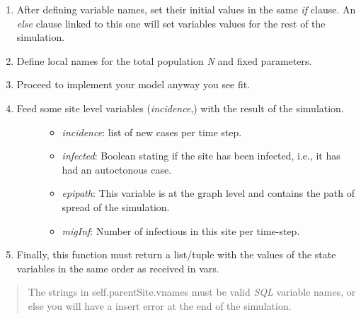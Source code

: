 \documentclass[a4paper,10pt]{manual}
\begin{document}
\begin{enumerate}
\begin{description}
\begin{enumerate}
\item {} 
After defining variable names, set their initial values in the same \emph{if} clause. An \emph{else} clause linked to this one will set variables values for the rest of the simulation.

\item {} 
Define local names for the total population \emph{N} and fixed parameters.

\item {} 
Proceed to implement your model anyway you see fit.

\item {} \begin{description}
\item[Feed some site level variables (\emph{incidence},) with the result of the simulation.]\begin{itemize}
\item {} 
\emph{incidence}: list of new cases per time step.

\item {} 
\emph{infected}: Boolean stating if the site has been infected, i.e., it has had an autoctonous case.

\item {} 
\emph{epipath}: This variable is at the graph level and contains the path of spread of the simulation.

\item {} 
\emph{migInf}: Number of infectious in this site per time-step.

\end{itemize}

\end{description}

\item {} 
Finally, this function must return a list/tuple with the values of the state variables in the same order as received in vars.

\end{enumerate}

\end{description}

\end{enumerate}
\begin{quote}

\begin{notice}[warning]
The strings in self.parentSite.vnames must be valid \emph{SQL} variable names, or else you will have a insert error at the end of the simulation.
\end{notice}
\end{quote}
\end{document}
